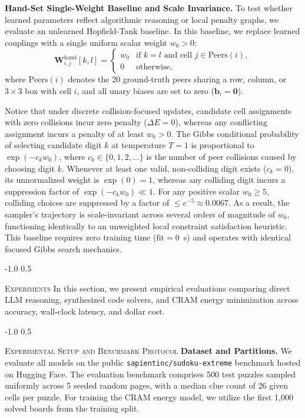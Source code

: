 \documentclass{article} %
\makeatletter
\renewcommand{\section}{\@startsection{section}{1}{\z@}%
  {-1.0\baselineskip}%
  {0.5\baselineskip}%
  {\normalfont\fontsize{12pt}{14pt}\selectfont\scshape\raggedright}}
\renewcommand{\subsection}{\@startsection{subsection}{2}{\z@}%
  {-1.0\baselineskip}%
  {0.5\baselineskip}%
  {\normalfont\fontsize{10pt}{12pt}\selectfont\scshape\raggedright}}
\makeatother
\begin{document}
\textbf{Hand-Set Single-Weight Baseline and Scale Invariance.} To test whether learned parameters reflect algorithmic reasoning or local penalty graphs, we evaluate an unlearned Hopfield-Tank baseline. In this baseline, we replace learned couplings with a single uniform scalar weight $w_0 > 0$:
\begin{equation}
    \mathbf{W}_{i,j}^{\mathrm{hand}}[k, l] = 
    \begin{cases}
        w_0 & \text{if } k = l \text{ and cell } j \in \mathrm{Peers}(i), \\
        0 & \text{otherwise},
    \end{cases}
    \label{eq:hand_set}
\end{equation}
where $\mathrm{Peers}(i)$ denotes the 20 ground-truth peers sharing a row, column, or $3 \times 3$ box with cell $i$, and all unary biases are set to zero ($\mathbf{b}_i = \mathbf{0}$). 

Notice that under discrete collision-focused updates, candidate cell assignments with zero collisions incur zero penalty ($\Delta E = 0$), whereas any conflicting assignment incurs a penalty of at least $w_0 > 0$. The Gibbs conditional probability of selecting candidate digit $k$ at temperature $T=1$ is proportional to $\exp(-c_k w_0)$, where $c_k \in \{0, 1, 2, \dots\}$ is the number of peer collisions caused by choosing digit $k$. Whenever at least one valid, non-colliding digit exists ($c_k = 0$), its unnormalized weight is $\exp(0) = 1$, whereas any colliding digit incurs a suppression factor of $\exp(-c_k w_0) \ll 1$. For any positive scalar $w_0 \ge 5$, colliding choices are suppressed by a factor of $\le e^{-5} \approx 0.0067$. As a result, the sampler's trajectory is scale-invariant across several orders of magnitude of $w_0$, functioning identically to an unweighted local constraint satisfaction heuristic. This baseline requires zero training time ($\text{fit} = 0$~s) and operates with identical focused Gibbs search mechanics.

\section{\textsc{Experiments}}
\label{sec:experiments}
In this section, we present empirical evaluations comparing direct LLM reasoning, synthesized code solvers, and CRAM energy minimization across accuracy, wall-clock latency, and dollar cost.

\subsection{\textsc{Experimental Setup and Benchmark Protocol}}
\textbf{Dataset and Partitions.} We evaluate all models on the public \texttt{sapientinc/sudoku-extreme} benchmark hosted on Hugging Face. The evaluation benchmark comprises 500 test puzzles sampled uniformly across 5 seeded random pages, with a median clue count of 26 given cells per puzzle. For training the CRAM energy model, we utilize the first 1,000 solved boards from the training split.
\end{document}
